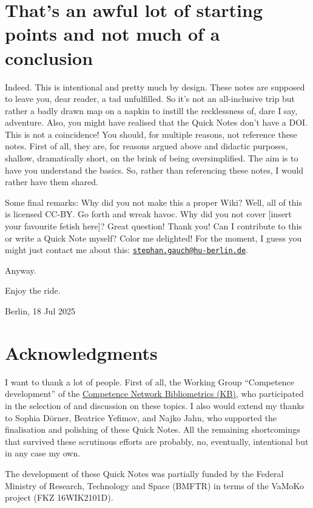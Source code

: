\documentclass[
  letterpaper,
]{scrreprt}
\begin{document}
\section{That's an awful lot of starting points and not much of a
conclusion}\label{thats-an-awful-lot-of-starting-points-and-not-much-of-a-conclusion}

Indeed. This is intentional and pretty much by design. These notes are
supposed to leave you, dear reader, a tad unfulfilled. So it's not an
all-inclusive trip but rather a badly drawn map on a napkin to instill
the recklessness of, dare I say, adventure. Also, you might have
realised that the Quick Notes don't have a DOI. This is not a
coincidence! You should, for multiple reasons, not reference these
notes. First of all, they are, for reasons argued above and didactic
purposes, shallow, dramatically short, on the brink of being
oversimplified. The aim is to have you understand the basics. So, rather
than referencing these notes, I would rather have them shared.

Some final remarks: Why did you not make this a proper Wiki? Well, all
of this is licensed CC-BY. Go forth and wreak havoc. Why did you not
cover {[}insert your favourite fetish here{]}? Great question! Thank
you! Can I contribute to this or write a Quick Note myself? Color me
delighted! For the moment, I guess you might just contact me about this:
\href{mailto:stephan.gauch@hu-berlin.de}{\nolinkurl{stephan.gauch@hu-berlin.de}}.

Anyway.

Enjoy the ride.

Berlin, 18 Jul 2025

\section{Acknowledgments}\label{acknowledgments}

I want to thank a lot of people. First of all, the Working Group
``Competence development'' of the
\href{https://bibliometrie.info/en/}{Competence Network Bibliometrics
(KB)}, who participated in the selection of and discussion on these
topics. I also would extend my thanks to Sophia Dörner, Beatrice
Yefimov, and Najko Jahn, who supported the finalisation and polishing of
these Quick Notes. All the remaining shortcomings that survived these
scrutinous efforts are probably, no, eventually, intentional but in any
case my own.

The development of these Quick Notes was partially funded by the Federal
Ministry of Research, Technology and Space (BMFTR) in terms of the
VaMoKo project (FKZ 16WIK2101D).
\end{document}
